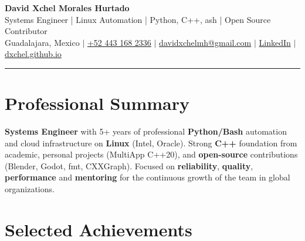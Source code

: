 \documentclass[10.5pt,a4paper]{article}
\newcommand{\smallmeta}[1]{{\small\color{midgray} #1}}
\begin{document}
\begin{center}
  {\fontsize{26}{28}\selectfont\bfseries\color{accent} David Xchel Morales Hurtado}\\[4pt]
  {\large\color{midgray} Systems Engineer | Linux Automation | Python, C++, ash | Open Source Contributor}\\[6pt]
  \smallmeta{
    Guadalajara, Mexico \; $\vert$ \;
    \href{tel:+52 443 168 2336}{+52 443 168 2336} \; $\vert$ \;
    \href{mailto:davidxchelmh@gmail.com}{davidxchelmh@gmail.com} \; $\vert$ \;
    \href{https://linkedin.com/in/david-xchel-morales-hurtado}{LinkedIn} \; $\vert$ \;
    \href{https://dxchel.github.io}{dxchel.github.io}
  }
\end{center}
\vspace{-2pt}
{\color{accent2}\rule{\linewidth}{1.3pt}}

\section*{Professional Summary}

\textbf{Systems Engineer} with 5+ years of professional \textbf{Python/Bash} automation and cloud infrastructure on \textbf{Linux} (Intel, Oracle). Strong \textbf{C++} foundation from academic, personal projects (MultiApp C++20), and \textbf{open-source} contributions (Blender, Godot, fmt, CXXGraph). Focused on \textbf{reliability}, \textbf{quality}, \textbf{performance} and \textbf{mentoring} for the continuous growth of the team in global organizations.

\section*{Selected Achievements}
\end{document}
